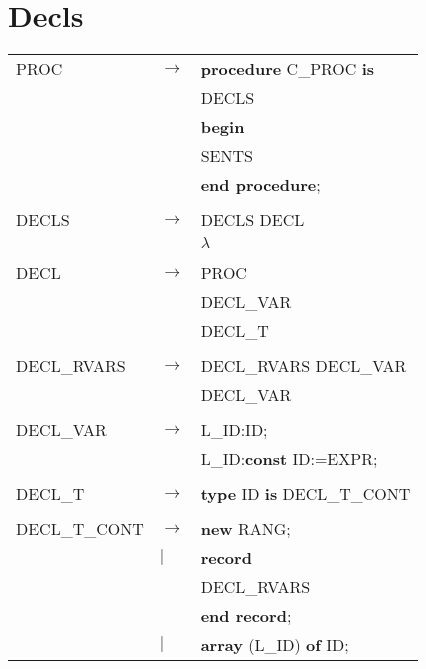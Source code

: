 \documentclass{article}
\begin{document}
	\section{Decls}
	\begin{tabular}{l l l}
		PROC&$\to$&\textbf{procedure} C\_PROC \textbf{is}\\
		&&\hspace*{5mm}DECLS\\
		&&\textbf{begin}\\
		&&\hspace*{5mm}SENTS\\
		&&\textbf{end procedure};\\
		\\
		DECLS&$\to$&DECLS DECL\\
		&\textbar&$\lambda$\\
		\\
		DECL&$\to$&PROC\\
		&\textbar&DECL\_VAR\\
		&\textbar&DECL\_T\\
		\\
		DECL\_RVARS&$\to$&DECL\_RVARS DECL\_VAR\\
		&\textbar&DECL\_VAR\\
		\\
		DECL\_VAR&$\to$&L\_ID:ID;\\
		&\textbar&L\_ID:\textbf{const} ID:=EXPR;\\
		\\
		DECL\_T&$\to$&\textbf{type} ID \textbf{is} DECL\_T\_CONT\\
		\\
		DECL\_T\_CONT&$\to$&\textbf{new} RANG;\\
		&$|$&\textbf{record}\\
		&&\hspace*{5mm}DECL\_RVARS\\
		&&\textbf{end record};\\
		&$|$&\textbf{array} (L\_ID) \textbf{of} ID;
	\end{tabular}
\end{document}

